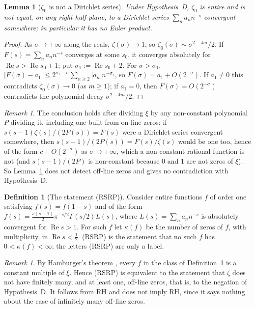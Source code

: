 \documentclass[11pt]{amsart}
\newtheorem{lemma}[theorem]{Lemma}
\theoremstyle{definition}
\newtheorem{definition}[theorem]{Definition}
\theoremstyle{remark}
\newtheorem{remark}[theorem]{Remark}
\newcommand{\RH}{\mathrm{RH}}
\renewcommand{\Re}{\operatorname{Re}}
\newcommand{\half}{\tfrac12}
\begin{document}
\begin{lemma}[$\zeta_0$ is not a Dirichlet series]\label{lem:noEuler}
Under Hypothesis~D, $\zeta_0$ is entire and is not equal, on any right half-plane, to a
Dirichlet series $\sum_na_nn^{-s}$ convergent somewhere; in particular it has no Euler
product.
\end{lemma}
\begin{proof}
As $\sigma\to+\infty$ along the reals, $\zeta(\sigma)\to1$, so
$\zeta_0(\sigma)\sim\sigma^{2-4m}/2$. If $F(s)=\sum_na_nn^{-s}$ converges at some $s_0$, it
converges absolutely for $\Re s>\Re s_0+1$; put $\sigma_1:=\Re s_0+2$. For $\sigma>\sigma_1$,
$|F(\sigma)-a_1|\le2^{\sigma_1-\sigma}\sum_{n\ge2}|a_n|n^{-\sigma_1}$, so
$F(\sigma)=a_1+O(2^{-\sigma})$. If $a_1\ne0$ this contradicts $\zeta_0(\sigma)\to0$ (as
$m\ge1$); if $a_1=0$, then $F(\sigma)=O(2^{-\sigma})$ contradicts the polynomial decay
$\sigma^{2-4m}/2$.
\end{proof}

\begin{remark}
The conclusion holds after dividing $\xi$ by any non-constant polynomial $P$ dividing it,
including one built from on-line zeros: if $s(s-1)\zeta(s)/(2P(s))=F(s)$ were a Dirichlet series
convergent somewhere, then $s(s-1)/(2P(s))=F(s)/\zeta(s)$ would be one too, hence of the form
$c+O(2^{-\sigma})$ as $\sigma\to+\infty$, which a non-constant rational function is not (and
$s(s-1)/(2P)$ is non-constant because $0$ and $1$ are not zeros of $\xi$). So
Lemma~\ref{lem:noEuler} does not detect off-line zeros and gives no contradiction with
Hypothesis~D.
\end{remark}

\begin{definition}[The statement (RSRP)]\label{def:wall}
Consider entire functions $f$ of order one satisfying $f(s)=f(1-s)$ and of the form
$f(s)=\tfrac{s(s-1)}2\pi^{-s/2}\Gamma(s/2)L(s)$, where $L(s)=\sum_na_nn^{-s}$ is absolutely
convergent for $\Re s>1$. For such $f$ let $\kappa(f)$ be the number of zeros of $f$, with
multiplicity, in $\Re s<\half$. (RSRP) is the statement that no such $f$ has
$0<\kappa(f)<\infty$; the letters (RSRP) are only a label.
\end{definition}

\begin{remark}\label{thm:wall}
By Hamburger's theorem \cite{Hamburger}, every $f$ in the class of
Definition~\ref{def:wall} is a constant multiple of $\xi$. Hence (RSRP) is equivalent to the
statement that $\zeta$ does not have finitely many, and at least one, off-line zeros, that is,
to the negation of Hypothesis~D. It follows from $\RH$ and does not imply $\RH$, since it says
nothing about the case of infinitely many off-line zeros.
\end{remark}
\end{document}
